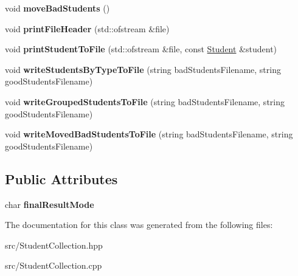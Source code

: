 \begin{DoxyCompactItemize}
\mbox{\label{class_student_collection_a7a877fdeef2cf0c785f257bbd3f425ac}} 
void {\bfseries move\+Bad\+Students} ()
\item 
\mbox{\label{class_student_collection_a8fcb6ca48251e3292e6c621c33edb687}} 
void {\bfseries print\+File\+Header} (std\+::ofstream \&file)
\item 
\mbox{\label{class_student_collection_a3235f164a3173c3e04d7e03b31555c78}} 
void {\bfseries print\+Student\+To\+File} (std\+::ofstream \&file, const \mbox{\hyperlink{class_student}{Student}} \&student)
\item 
\mbox{\label{class_student_collection_ad7a1b18f6dc494b82544a38ea67beda1}} 
void {\bfseries write\+Students\+By\+Type\+To\+File} (string bad\+Students\+Filename, string good\+Students\+Filename)
\item 
\mbox{\label{class_student_collection_ad996524698897e4fd5b55ed702bdfff0}} 
void {\bfseries write\+Grouped\+Students\+To\+File} (string bad\+Students\+Filename, string good\+Students\+Filename)
\item 
\mbox{\label{class_student_collection_a19c1f583bf585de7bcbf45b1870a603a}} 
void {\bfseries write\+Moved\+Bad\+Students\+To\+File} (string bad\+Students\+Filename, string good\+Students\+Filename)
\end{DoxyCompactItemize}
\subsection*{Public Attributes}
\begin{DoxyCompactItemize}
\item 
\mbox{\label{class_student_collection_ae3e0a71d115c469667cc7e645cd38f73}} 
char {\bfseries final\+Result\+Mode}
\end{DoxyCompactItemize}


The documentation for this class was generated from the following files\+:\begin{DoxyCompactItemize}
\item 
src/Student\+Collection.\+hpp\item 
src/Student\+Collection.\+cpp\end{DoxyCompactItemize}
